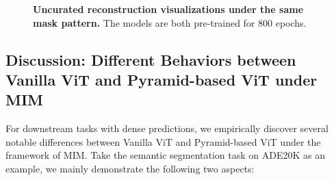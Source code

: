 \documentclass{article}
\begin{document}
\begin{figure}[t]
	\vspace{0pt}
	\begin{center}
		\setlength{\fboxrule}{0pt}
	\end{center}	
	\vspace{-15pt}
	\caption{\textbf{Uncurated reconstruction visualizations under the same  mask pattern.} The models are both pre-trained for 800 epochs.
	}
	\label{fig_visual_reconstruction_cropped}
	\vspace{-7pt}
\end{figure}


\subsection{Discussion: Different Behaviors between Vanilla ViT and Pyramid-based ViT under MIM} 
For downstream tasks with dense predictions, we empirically discover several notable differences between Vanilla ViT and Pyramid-based ViT under the framework of MIM. Take the semantic segmentation task on ADE20K as an example, we mainly demonstrate the following two aspects:
\end{document}
